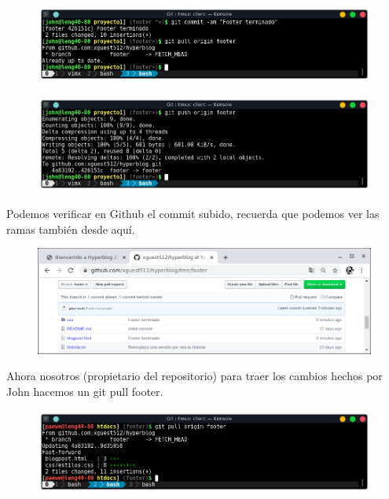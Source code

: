 \documentclass{article}
\begin{document}
\newpage

\begin{figure}[h!]
  \centering
  \includegraphics[scale=0.75]{./Pictures/284_commit_pull.png}
\end{figure}

\begin{figure}[h!]
  \centering
  \includegraphics[scale=0.75]{./Pictures/285_push_footer.png}
\end{figure}

Podemos verificar en Github el commit subido, recuerda que podemos ver las
ramas también desde aquí.

\begin{figure}[h!]
  \centering
  \includegraphics[scale=0.75]{./Pictures/286_Gh_footer.png}
\end{figure}

Ahora nosotros (propietario del repositorio) para traer los cambios hechos por
John hacemos un git pull footer.

\begin{figure}[h!]
  \centering
  \includegraphics[scale=0.75]{./Pictures/287_pull_footer.png}
\end{figure}
\end{document}

